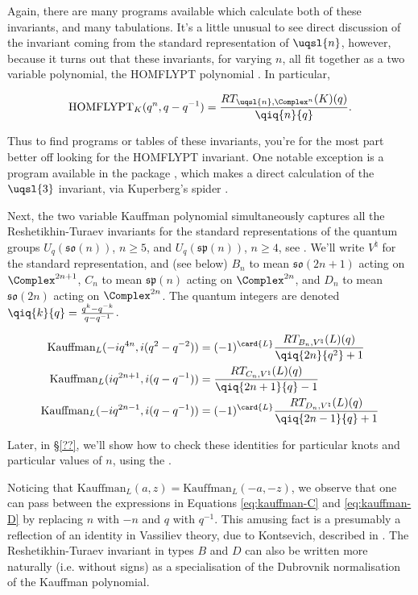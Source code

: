 Again, there are many programs available which calculate both of these
invariants, and many tabulations. It's a little unusual to see direct
discussion of the invariant coming from the standard representation of
$\uqsl{n}$, however, because it turns out that these invariants, for
varying $n$, all fit together as a two variable polynomial, the HOMFLYPT
polynomial \cite{MR776477}. In particular,

$$\text{HOMFLYPT}_K(q^n, q-q^{-1}) = \frac{RT_{\uqsl{n}, \Complex^n}(K)(q)}{\qiq{n}{q}}.$$

Thus to find programs or tables of these invariants, you're for the most
part better off looking for the HOMFLYPT invariant. One notable exception
is a program available in the  \MMA package \cite{???},
which makes a direct calculation of the $\uqsl{3}$ invariant, via
Kuperberg's spider \cite{???}.

Next, the two variable Kauffman polynomial \cite{MR958895} simultaneously
captures all the Reshetikhin-Turaev invariants for the standard
representations of the quantum groups $U_q(\mathfrak{so}(n))$, $n \geq
5$, and $U_q(\mathfrak{sp}(n))$, $n \geq 4$, see \cite{MR939474, MR1090432}.
We'll write $V^\natural$ for the standard representation, and (see below)
$B_n$ to mean $\mathfrak{so}(2n+1)$ acting on $\Complex^{2n+1}$, $C_n$ to
mean $\mathfrak{sp}(n)$ acting on $\Complex^{2n}$, and $D_n$ to mean
$\mathfrak{so}(2n)$ acting on $\Complex^{2n}$. The quantum integers are
denoted $\qiq{k}{q} = \frac{q^k-q^{-k}}{q-q^{-1}}$.

\begin{align}
\label{eq:kauffman-B}%
\text{Kauffman}_L(-i q^{4n}, i (q^2-q^{-2})) & = (-1)^{\card{L}} \frac{RT_{B_n, V^\natural}(L)(q)}{\qiq{2n}{q^2} + 1} \\
\label{eq:kauffman-C}%
\text{Kauffman}_L(i q^{2n+1}, i (q-q^{-1})) & =  \frac{RT_{C_n, V^\natural}(L)(q)}{\qiq{2n+1}{q} - 1} \\
\label{eq:kauffman-D}%
\text{Kauffman}_L(-i q^{2n-1}, i (q-q^{-1})) & = (-1)^{\card{L}} \frac{RT_{D_n, V^\natural}(L)(q)}{\qiq{2n-1}{q} + 1}
\end{align}

Later, in \S \ref{??}, we'll show how to check these identities for particular knots and particular values of $n$, using the \pkg. \todo{}

Noticing that $\text{Kauffman}_L(a,z) = \text{Kauffman}_L(-a,-z)$, we
observe that one can pass between the expressions in Equations
\ref{eq:kauffman-C} and \ref{eq:kauffman-D} by replacing $n$ with $-n$
and $q$ with $q^{-1}$. This amusing fact is a presumably a reflection of
an identity in Vassiliev theory, due to Kontsevich, described in
\cite[Exercise 6.37]{MR1318886}. The Reshetikhin-Turaev invariant in types $B$ and $D$ can also be written more naturally (i.e. without signs)
as a specialisation of the Dubrovnik normalisation \cite{MR966143,MR980759} of the Kauffman polynomial.

